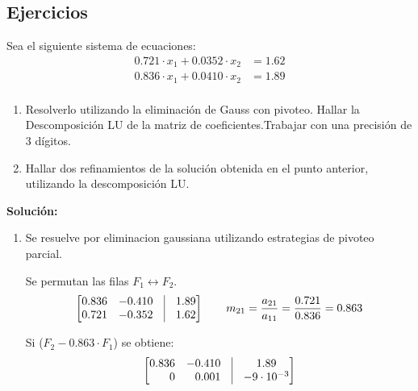 \documentclass[../main.tex]{subfiles}
\begin{document}
    \subsection{Ejercicios}
        \begin{example}
            Sea el siguiente sistema de ecuaciones:
            \begin{equation}
                \begin{split}
                    0.721 \cdot x_1 + 0.0352 \cdot x_2 &= 1.62\\
                    0.836 \cdot x_1 + 0.0410 \cdot x_2 &= 1.89\\
                \end{split}
            \end{equation}

            \begin{enumerate}
                \item Resolverlo utilizando la eliminación de Gauss con pivoteo. Hallar la Descomposición LU de la matriz de coeficientes.Trabajar con una precisión de 3 dígitos.
                \item Hallar dos refinamientos de la solución obtenida en el punto anterior, utilizando la descomposición LU.  
            \end{enumerate}

            \textbf{Solución:}
            \begin{enumerate}
                \item 
                    Se resuelve por eliminacion gaussiana utilizando estrategias de pivoteo parcial.

                    Se permutan las filas $F_1 \longleftrightarrow F_2$.
                    \begin{equation}
                        \begin{bmatrix*}[r]
                            0.836 & -0.410 & \vrule & 1.89\\
                            0.721 & -0.352 & \vrule & 1.62 
                        \end{bmatrix*}
                        \quad \quad m_{21} = \frac{a_{21}}{a_{11}} = \frac{0.721}{0.836} = 0.863
                    \end{equation}

                    Si ($F_2 - 0.863 \cdot F_1$) se obtiene:
                    \begin{equation}
                        \begin{bmatrix*}[r]
                            0.836 & -0.410 & \vrule & \hfill 1.89 \hfill\\
                            0 & 0.001 & \vrule & -9 \cdot 10^{-3} 
                        \end{bmatrix*}
                    \end{equation}


\end{enumerate}
\end{example}
\end{document}
